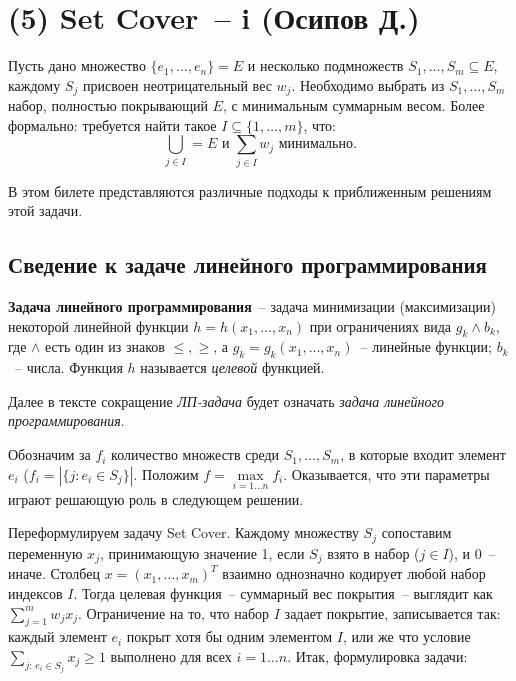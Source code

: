 \hypertarget{setcover}{\section{(5) Set Cover~-- i (Осипов Д.)}}


\begin{problem*}
	Пусть дано множество $\{e_1, \ldots, e_n\} = E$ и несколько подмножеств $S_1, \ldots, S_m \subseteq E$, каждому $S_j$ присвоен неотрицательный вес $w_j$. Необходимо выбрать из $S_1, \ldots, S_m$ набор, полностью покрывающий $E$, с минимальным суммарным весом. Более формально: требуется найти такое $I \subseteq \{1, \ldots, m\}$, что: $$\bigcup_{j\in I} = E \text{ и } \sum_{j \in I} w_j \text{ минимально.}$$
\end{problem*}

В этом билете представляются различные подходы к приближенным решениям этой задачи.

\subsection{Сведение к задаче линейного программирования}

\begin{definition*}
	{\bfseries Задача линейного программирования}~-- задача минимизации (максимизации) некоторой линейной функции $h = h(x_1, \ldots, x_n)$ при ограничениях вида $g_k \land b_k$, где $\land$ есть один из знаков $\leq, \geq$, а $g_k = g_k(x_1, \ldots, x_n)$~-- линейные функции; $b_k$~-- числа. Функция $h$ называется \textit{целевой} функцией.
\end{definition*}

Далее в тексте сокращение \textit{ЛП-задача} будет означать \textit{задача линейного программирования}.

Обозначим за $f_i$ количество множеств среди $S_1, \ldots, S_m$, в которые входит элемент $e_i$ ($f_i = \left|\{j: e_i \in S_j\}\right|$. Положим $f = \max\limits_{i=1\ldots n} f_i$. Оказывается, что эти параметры играют решающую роль в следующем решении.

Переформулируем задачу Set Cover. Каждому множеству $S_j$ сопоставим переменную $x_j$, принимающую значение 1, если $S_j$ взято в набор ($j \in I$), и 0~-- иначе. Столбец $x = (x_1, \ldots, x_m)^T$ взаимно однозначно кодирует любой набор индексов $I$. Тогда целевая функция~-- суммарный вес покрытия~-- выглядит как $\sum\limits_{j=1}^m w_j x_j$. Ограничение на то, что набор $I$ задает покрытие, записывается так: каждый элемент $e_i$ покрыт хотя бы одним элементом $I$, или же что условие $\sum\limits_{j:\, e_i \in S_j} x_j \geq 1$ выполнено для всех $i=1\ldots n$. Итак, формулировка задачи:

